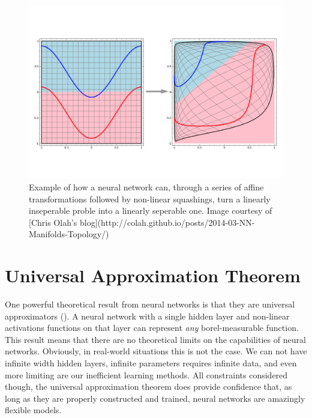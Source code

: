 \documentclass[]{book}
\theoremstyle{definition}
\theoremstyle{definition}
\theoremstyle{definition}
\theoremstyle{remark}
\begin{document}
\begin{figure}

{\centering \includegraphics{figures/warp_space} 

}

\caption{Example of how a neural network can, through a series of affine transformations followed by non-linear squashings, turn a linearly inseperable proble into a linearly seperable one. Image courtesy of [Chris Olah's blog](http://colah.github.io/posts/2014-03-NN-Manifolds-Topology/)}\label{fig:geometricinterp}
\end{figure}

\section{Universal Approximation
Theorem}\label{universal-approximation-theorem}

One powerful theoretical result from neural networks is that they are
universal approximators (\citet{universal_approximators}). A neural
network with a single hidden layer and non-linear activations functions
on that layer can represent \emph{any} borel-measurable function. This
result means that there are no theoretical limits on the capabilities of
neural networks. Obviously, in real-world situations this is not the
case. We can not have infinite width hidden layers, infinite parameters
requires infinite data, and even more limiting are our inefficient
learning methods. All constraints considered though, the universal
approximation theorem does provide confidence that, as long as they are
properly constructed and trained, neural networks are amazingly flexible
models.
\end{document}
